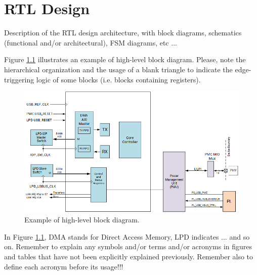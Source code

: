 \chapter{RTL Design}\label{chapter:3}
Description of the RTL design architecture, with block diagrams, schematics (functional and/or architectural), FSM diagrams, etc ...

Figure \ref{fig:example} illustrates an example of high-level block diagram. Please, note the hierarchical organization and the usage of a blank triangle to indicate the edge-triggering logic of some blocks (i.e. blocks containing registers).

\begin{figure}[h]  %
\centering
\includegraphics[width=\textwidth]{img/high_level_block_diagr.png}
\caption{Example of high-level block diagram.}\label{fig:example}
\end{figure}

In Figure \ref{fig:example}, DMA stands for Direct Access Memory, LPD indicates ... and so on. Remember to explain any symbols and/or terms and/or acronyms in figures and tables that have not been explicitly explained previously. Remember also to define each acronym before its usage!!!